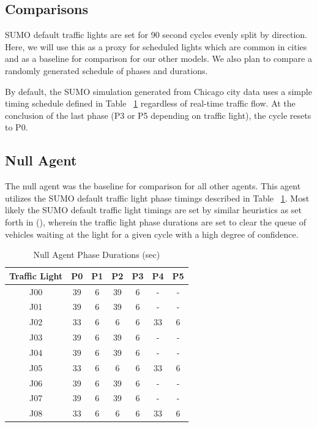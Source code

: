 \documentclass[twocolumn]{article}
\begin{document}
\subsection{Comparisons}

SUMO default traffic lights are set for 90 second cycles evenly split by direction.  Here, we will use this as a proxy for scheduled lights which are common in cities and as a baseline for comparison for our other models.  We also plan to compare a randomly generated schedule of phases and durations.


By default, the SUMO simulation generated from Chicago city data uses a simple timing schedule defined in Table ~\ref{tab:baseline_params} regardless of real-time traffic flow. At the conclusion of the last phase (P3 or P5 depending on traffic light), the cycle resets to P0.

\subsection{Null Agent}

The null agent was the baseline for comparison for all other agents. This agent utilizes the SUMO default traffic light phase timings described in Table ~\ref{tab:baseline_params}. Most likely the SUMO default traffic light timings are set by similar heuristics as set forth in (\cite{USDOT}), wherein the traffic light phase durations are set to clear the queue of vehicles waiting at the light for a given cycle with a high degree of confidence.

\begin{table}[H]
    \centering
    \begin{tabular}{|c|c|c|c|c|c|c|}
        \hline
         Traffic Light & P0 & P1 &  P2 & P3 & P4 &  P5 \\
        \hline\hline
        J00 & 39 &	6 & 39 & 6 & - & - \\
        \hline
        J01 & 39 &	6 & 39 & 6 & - & - \\
        \hline
        J02 & 33 &	6 & 6 & 6 & 33 & 6 \\
        \hline
        J03 & 39 &	6 & 39 & 6 & - & - \\
        \hline
        J04 & 39 &	6 & 39 & 6 & - & - \\
        \hline
        J05 & 33 &	6 & 6 & 6 & 33 & 6 \\
        \hline
        J06 & 39 &	6 & 39 & 6 & - & - \\
        \hline
        J07 & 39 &	6 & 39 & 6 & - & - \\
        \hline
        J08 & 33 &	6 & 6 & 6 & 33 & 6 \\
        \hline
    \end{tabular}
    \caption{Null Agent Phase Durations (sec)}
    \label{tab:baseline_params}
\end{table}
\end{document}
